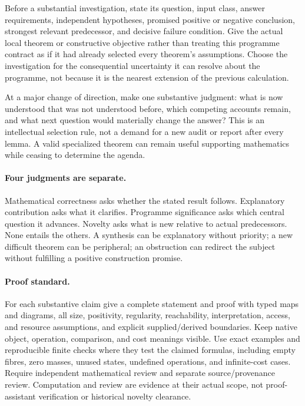 \documentclass[11pt]{article}
\theoremstyle{definition}
\begin{document}
Before a substantial investigation, state its question, input class, answer requirements, independent hypotheses, promised positive or negative conclusion, strongest relevant predecessor, and decisive failure condition. Give the actual local theorem or constructive objective rather than treating this programme contract as if it had already selected every theorem's assumptions. Choose the investigation for the consequential uncertainty it can resolve about the programme, not because it is the nearest extension of the previous calculation.

At a major change of direction, make one substantive judgment: what is now understood that was not understood before, which competing accounts remain, and what next question would materially change the answer? This is an intellectual selection rule, not a demand for a new audit or report after every lemma. A valid specialized theorem can remain useful supporting mathematics while ceasing to determine the agenda.

\paragraph{Four judgments are separate.}
Mathematical correctness asks whether the stated result follows. Explanatory contribution asks what it clarifies. Programme significance asks which central question it advances. Novelty asks what is new relative to actual predecessors. None entails the others. A synthesis can be explanatory without priority; a new difficult theorem can be peripheral; an obstruction can redirect the subject without fulfilling a positive construction promise.

\paragraph{Proof standard.}
For each substantive claim give a complete statement and proof with typed maps and diagrams, all size, positivity, regularity, reachability, interpretation, access, and resource assumptions, and explicit supplied/derived boundaries. Keep native object, operation, comparison, and cost meanings visible. Use exact examples and reproducible finite checks where they test the claimed formulas, including empty fibres, zero masses, unused states, undefined operations, and infinite-cost cases. Require independent mathematical review and separate source/provenance review. Computation and review are evidence at their actual scope, not proof-assistant verification or historical novelty clearance.
\end{document}
